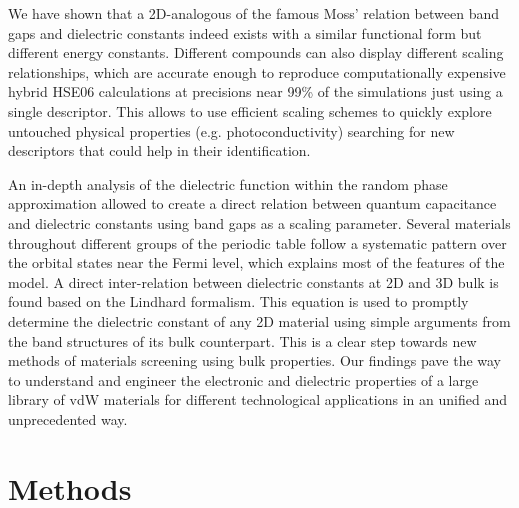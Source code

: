 \documentclass[journal=ancac3,manuscript=article,email=true,hyperref=true,keywords=true]{achemso}
\begin{document}
We have shown that a 2D-analogous of the famous Moss' 
relation between band gaps and 
dielectric constants indeed exists with a similar functional 
form but different energy constants. 
Different compounds can also display different scaling relationships, 
which are accurate enough to reproduce computationally 
expensive hybrid HSE06 calculations at precisions 
near 99\% of the simulations just using a single descriptor. 
This allows to use efficient scaling schemes to quickly explore untouched physical
properties (e.g. photoconductivity) searching for new descriptors 
that could help in their identification. 

An in-depth analysis of the dielectric function within the random phase approximation allowed to 
create a direct relation between quantum capacitance and dielectric constants 
using band gaps as a scaling parameter. Several materials throughout different 
groups of the periodic table follow a systematic pattern over the orbital states near the Fermi level, 
which explains most of the features of the model. A direct inter-relation between 
dielectric constants at 2D and 3D bulk is found based on the Lindhard formalism. 
This equation is used to promptly determine the dielectric constant of any 
2D material using simple arguments from the band structures of its bulk 
counterpart. This is a clear step towards new methods of materials screening using bulk properties. 
Our findings pave the way to understand and engineer 
the electronic and dielectric properties of a large library of vdW materials 
for different technological applications in an unified and unprecedented way. 


% 
%




\section{Methods}
\label{sec:org3881bef}
\end{document}
